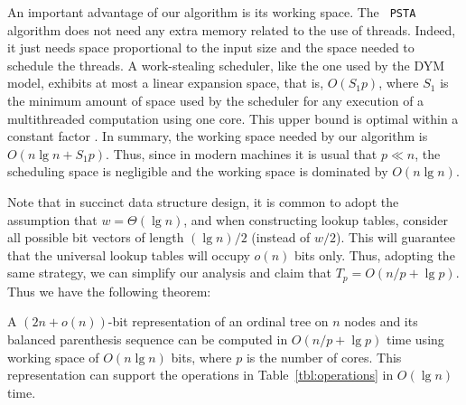 An important advantage of our algorithm is its working space. The {\tt
PSTA} algorithm does not need any extra memory related to the use of
threads. Indeed, it just needs space proportional to the input size
and the space needed to schedule the threads. A work-stealing
scheduler, like the one used by the DYM model, exhibits at most a
linear expansion space, that is, $O(S_1p)$, where $S_1$ is the minimum
amount of space used by the scheduler for any execution of a
multithreaded computation using one core. This upper bound is
optimal within a constant factor
\cite{Blumofe:1999:SMC:324133.324234}. In summary, the working space
needed by our algorithm is $O(n\lg n+S_1p)$. Thus, since in modern
machines it is usual that $p\ll n$, the scheduling space is negligible
and the working space is dominated by $O(n\lg n)$. 


Note that in succinct data structure design, it is common to adopt the assumption that $w = \Theta(\lg n)$, and when constructing lookup tables, consider all possible bit vectors of length $(\lg n)/2$ (instead of $w/2$).
This will guarantee that the universal lookup tables will occupy $o(n)$ bits only.
Thus, adopting the same strategy, we can simplify our analysis and claim that $T_p = O(n/p + \lg p)$.
Thus we have the following theorem: 
\begin{theorem}\label{lem:lg}
A $(2n+o(n))$-bit representation of an ordinal tree on $n$ nodes and its balanced parenthesis sequence can be computed in $O(n/p + \lg p)$ time using working space of $O(n\lg n)$ bits, where $p$ is the number of cores.
This representation can support the operations in Table~\ref{tbl:operations} in $O(\lg n)$ time.
\end{theorem}